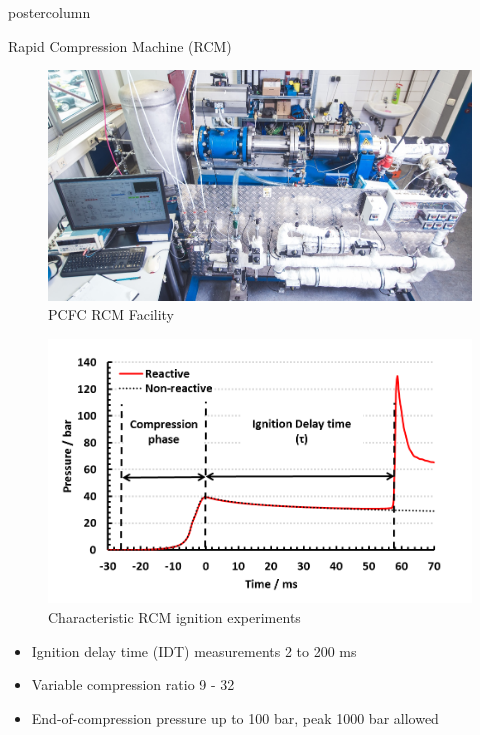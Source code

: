 \documentclass[final,hyperref={pdfpagelabels=false}]{beamer}
\begin{document}
\begin{frame}
\begin{columns}
\begin{column}{.98\textwidth}
		\begin{beamercolorbox}[center,wd=\textwidth]{postercolumn}
		\begin{block}{\LARGE Rapid Compression Machine (RCM)}
			\begin{multicols}{3}
				\begin{figure}
					\centering
					\includegraphics[width=0.96\linewidth]{../figures/PCFC_RCM.jpg}
					\caption{PCFC RCM Facility}
				\end{figure}
				\columnbreak
				\begin{figure}
					\centering
					\includegraphics[width=0.96\linewidth]{../figures/RCM_typical.png}
					\caption{Characteristic RCM ignition experiments}
				\end{figure}
				\columnbreak
				\null \vfill
				\begin{itemize}
					\item Ignition delay time (IDT) measurements 2 to 200 ms
					\item Variable compression ratio 9 - 32
					\item End-of-compression pressure up to 100 bar, peak 1000 bar allowed
				\end{itemize}
				\vfill \null
			\end{multicols}
		\end{block}	
	\end{beamercolorbox}


\end{column}
\end{columns}
\end{frame}
\end{document}
